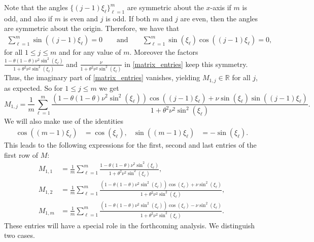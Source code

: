\documentclass[a4paper]{article}
\begin{document}
Note that the angles $\{(j-1)\xi_\ell\}_{\ell=1}^m$ are symmetric about the $x$-axis if $m$ is odd, and
also if $m$ is even and $j$ is odd.
If both $m$ and $j$ are even, then the angles are symmetric about the origin.
Therefore, we have that
\begin{align*}
	\sum_{\ell=1}^{m} \sin((j-1)\xi_\ell) = 0 \qquad \text{and} \qquad
		\sum_{\ell=1}^{m} \sin(\xi_\ell)\cos((j-1)\xi_\ell) = 0,
\end{align*}
for all $1\le j\le m$  and for any value of $m$.
Moreover the factors
$\frac{1-\theta(1-\theta)\nu^2\sin^2(\xi_\ell)}{1+\theta^2\nu^2 \sin^2(\xi_\ell)}$
and $\frac{\nu}{1+\theta^2\nu^2 \sin^2(\xi_\ell)}$ in \eqref{matrix_entries} keep this symmetry.
Thus, the imaginary part of \eqref{matrix_entries} vanishes, yielding $M_{1,j}\in\mathbb{R}$ for all $j$,
as expected.
So for $1\le j\le m$ we get
\[
  M_{1,j}  = \frac{1}{m} \sum_{\ell=1}^{m} \frac{\left(1-\theta(1-\theta)\nu^2\sin^2(\xi_\ell)\right)
  \cos((j-1)\xi_\ell) + \nu \sin(\xi_\ell)\sin((j-1)\xi_\ell)}{1+\theta^2\nu^2 \sin^2(\xi_\ell)}.
\]
We will also make use of the identities
\begin{align} \label{angle-identities}
    \cos((m-1)\xi_\ell) & = \cos(\xi_\ell), & \sin((m-1)\xi_\ell) & = -\sin(\xi_\ell).
\end{align}
This leads to the following expressions for the first, second and last entries of the first
row of $M$:
\begin{align*}
	M_{1,1} & = \frac{1}{m} \sum_{\ell=1}^m \frac{1-\theta(1-\theta)\nu^2\sin^2(\xi_\ell)}
		{1+\theta^2\nu^2\sin^2(\xi_\ell)}, \\
	M_{1,2} & = \frac{1}{m} \sum_{\ell=1}^{m} \frac{\left(1-\theta(1-\theta)\nu^2\sin^2(\xi_\ell)\right)
		\cos(\xi_\ell) + \nu \sin^2(\xi_\ell)}{1+\theta^2\nu^2 \sin^2(\xi_\ell)}, \\
	M_{1,m} & = \frac{1}{m} \sum_{\ell=1}^m \frac{\left(1-\theta(1-\theta)\nu^2\sin^2(\xi_\ell)\right)
		\cos(\xi_\ell) - \nu \sin^2 (\xi_\ell)}{1+\theta^2\nu^2 \sin^2 (\xi_\ell)}.
\end{align*}
These entries will have a special role in the forthcoming analysis. 
We distinguish two cases.
\end{document}
